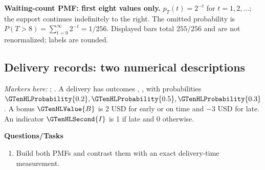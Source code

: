 \par\noindent \begin{minipage}[t]{.98\linewidth}
\centering
{}
\par\small \textbf{Waiting-count PMF: first eight values only.} $p_T(t)=2^{-t}$ for $t=1,2,\ldots$; the support continues indefinitely to the right. The omitted probability is $P(T>8)=\sum_{t=9}^{\infty}2^{-t}=1/256$. Displayed bars total $255/256$ and are not renormalized; labels are rounded.
\end{minipage}\par\medskip

\subsection{Delivery records: two numerical descriptions}
\textit{Markers here:} ; .
A delivery has outcomes , ,  with probabilities $\GTenHLProbability{0.2},\GTenHLProbability{0.5},\GTenHLProbability{0.3}$. A bonus $\GTenHLValue{B}$ is 2 USD for early or on time and $-3$ USD for late. An indicator $\GTenHLSecond{I}$ is 1 if late and 0 otherwise.

\textbf{Questions/Tasks}
\begin{enumerate}
\item Build both PMFs and contrast them with an exact delivery-time measurement.
\end{enumerate}
